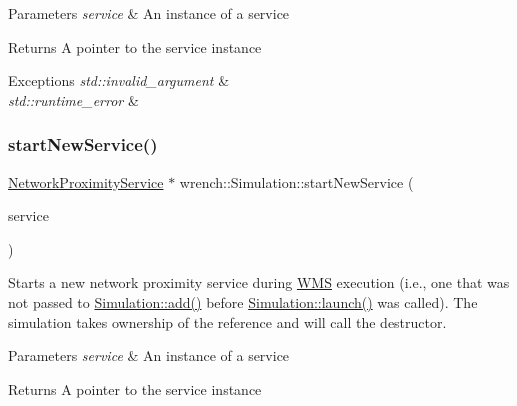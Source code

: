 \begin{DoxyParams}{Parameters}
{\em service} & An instance of a service \\
\hline
\end{DoxyParams}
\begin{DoxyReturn}{Returns}
A pointer to the service instance
\end{DoxyReturn}

\begin{DoxyExceptions}{Exceptions}
{\em std\+::invalid\+\_\+argument} & \\
\hline
{\em std\+::runtime\+\_\+error} & \\
\hline
\end{DoxyExceptions}
\mbox{\label{classwrench_1_1_simulation_a7691eeb05b21e77d4a667b5931851001}} 
\subsubsection{\texorpdfstring{start\+New\+Service()}{startNewService()}\hspace{0.1cm}{\footnotesize\ttfamily [3/4]}}
{\footnotesize\ttfamily \hyperlink{classwrench_1_1_network_proximity_service}{Network\+Proximity\+Service} $\ast$ wrench\+::\+Simulation\+::start\+New\+Service (\begin{DoxyParamCaption}\item[{\hyperlink{classwrench_1_1_network_proximity_service}{Network\+Proximity\+Service} $\ast$}]{service }\end{DoxyParamCaption})}



Starts a new network proximity service during \hyperlink{classwrench_1_1_w_m_s}{W\+MS} execution (i.\+e., one that was not passed to \hyperlink{classwrench_1_1_simulation_ad1f5c12285ecfaf5a2ce7dab5ec8b4c5}{Simulation\+::add()} before \hyperlink{classwrench_1_1_simulation_ae9589632de9a2311ed1d7f7747478985}{Simulation\+::launch()} was called). The simulation takes ownership of the reference and will call the destructor. 


\begin{DoxyParams}{Parameters}
{\em service} & An instance of a service \\
\hline
\end{DoxyParams}
\begin{DoxyReturn}{Returns}
A pointer to the service instance
\end{DoxyReturn}


